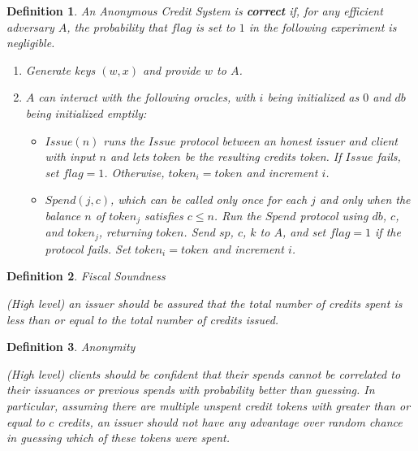 \documentclass{article}
\newtheorem{definition}{Definition}
\begin{document}
\begin{definition}

An Anonymous Credit System is \textbf{correct} if, for any efficient adversary
    $A$, the probability that $flag$ is set to $1$ in the following experiment
    is negligible.

\begin{enumerate}
    \item Generate keys $(w, x)$ and provide $w$ to $A$.
    \item $A$ can interact with the following oracles, with $i$ being initialized
          as $0$ and $db$ being initialized emptily:
        \begin{itemize}

            \item $Issue(n)$ runs the $Issue$ protocol between an honest issuer
                and client with input $n$ and lets $token$ be the resulting
                credits token. If $Issue$ fails, set $flag = 1$. Otherwise,
                $token_i = token$ and increment $i$.

            \item $Spend(j, c)$, which can be called only once for each $j$ and
                only when the balance $n$ of $token_j$ satisfies $c \leq n$.
                Run the $Spend$ protocol using $db$, $c$, and $token_j$,
                returning $token$.  Send $sp$, $c$, $k$ to $A$, and set $flag =
                1$ if the protocol fails. Set $token_i = token$ and increment
                $i$.

        \end{itemize}
\end{enumerate}
\end{definition}


\begin{definition}{Fiscal Soundness}

    (High level) an issuer should be assured that the total number of credits spent is less than or equal to the total number of credits issued.
\end{definition}

\begin{definition}{Anonymity}

    (High level) clients should be confident that their spends cannot be correlated to their issuances or previous spends with probability better than guessing. In particular, assuming there are multiple unspent credit tokens with greater than or equal to $c$ credits, an issuer should not have any advantage over random chance in guessing which of these tokens were spent.
\end{definition}
\end{document}

